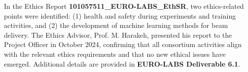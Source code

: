 


In the Ethics Report \textbf{101057511\_EURO-LABS\_EthSR}, two ethics-related points were identified: (1) health and safety during experiments and training activities, and (2) the development of machine learning methods for beam delivery. The Ethics Advisor, Prof. M. Harakeh, presented his report to the Project Officer in October 2024, confirming that all consortium activities align with the relevant ethics requirements and that no new ethical issues have emerged. Additional details are provided in \textbf{EURO-LABS Deliverable 6.1}. 

